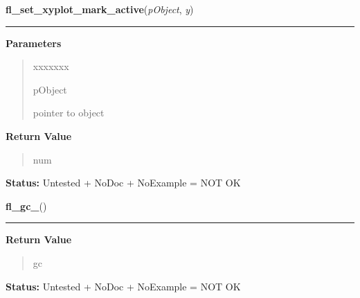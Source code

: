 \hspace{.8\funcindent}\begin{boxedminipage}{\funcwidth}

    \raggedright \textbf{fl\_set\_xyplot\_mark\_active}(\textit{pObject}, \textit{y})

    \vspace{-1.5ex}

    \rule{\textwidth}{0.5\fboxrule}
\setlength{\parskip}{2ex}
\setlength{\parskip}{1ex}
      \textbf{Parameters}
      \vspace{-1ex}

      \begin{quote}
        \begin{Ventry}{xxxxxxx}

          \item[pObject]

          pointer to object

        \end{Ventry}

      \end{quote}

      \textbf{Return Value}
    \vspace{-1ex}

      \begin{quote}
      num

      \end{quote}

\textbf{Status:} Untested + NoDoc + NoExample = NOT OK



    \end{boxedminipage}

    \label{xformslib:library:fl_gc_}

    \vspace{0.5ex}

\hspace{.8\funcindent}\begin{boxedminipage}{\funcwidth}

    \raggedright \textbf{fl\_gc\_}()

    \vspace{-1.5ex}

    \rule{\textwidth}{0.5\fboxrule}
\setlength{\parskip}{2ex}
\setlength{\parskip}{1ex}
      \textbf{Return Value}
    \vspace{-1ex}

      \begin{quote}
      gc

      \end{quote}

\textbf{Status:} Untested + NoDoc + NoExample = NOT OK



    \end{boxedminipage}

